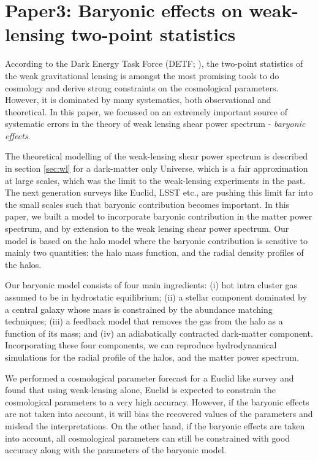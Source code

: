 \chapter{Paper3: Baryonic effects on weak-lensing two-point statistics}\label{paper:baryoniceffects}

According to the Dark Energy Task Force (DETF; \cite{2006astro.ph..9591A}), 
the two-point statistics of the weak gravitational lensing is amongst the most promising
tools to do cosmology and derive strong constraints on the cosmological parameters. 
However, it is dominated by many systematics, both observational and theoretical.
In this paper, we focussed on an extremely important source of systematic errors in the 
theory of weak lensing shear power spectrum - {\it baryonic effects}. 

The theoretical modelling of the weak-lensing shear power spectrum
is described in section \ref{sec:wl} for a dark-matter only Universe, 
which is a fair approximation
at large scales, which was the limit to the weak-lensing experiments in the past. 
The next generation surveys like Euclid, LSST etc., 
are pushing this limit far into the small scales such
that baryonic contribution becomes important. In this paper, we built a model
to incorporate baryonic contribution in the matter power spectrum,
and by extension to the weak lensing shear power spectrum. Our model is based on 
the halo model where the baryonic contribution is sensitive to mainly two quantities: 
the halo mass function, and the radial density profiles of the halos.

Our baryonic model consists of four main ingredients: 
(i) hot intra cluster gas assumed to be in hydrostatic equilibrium;
(ii) a stellar component dominated by a central galaxy 
whose mass is constrained by the abundance matching techniques;
(iii) a feedback model that removes the gas from the halo as a function
of its mass; and 
(iv) an adiabatically contracted dark-matter component. 
Incorporating these four components, 
we can reproduce hydrodynamical simulations 
for the radial profile of the halos, and the matter power spectrum. 

We performed a cosmological parameter forecast for a Euclid like survey and found that using
weak-lensing alone, Euclid is expected to constrain the cosmological parameters to a very
high accuracy. However, if the baryonic effects are not taken into account, it will bias
the recovered values of the parameters and mislead the interpretations. On the other hand,
if the baryonic effects are taken into account, all cosmological
parameters can still be constrained with good accuracy along with the parameters
of the baryonic model.

